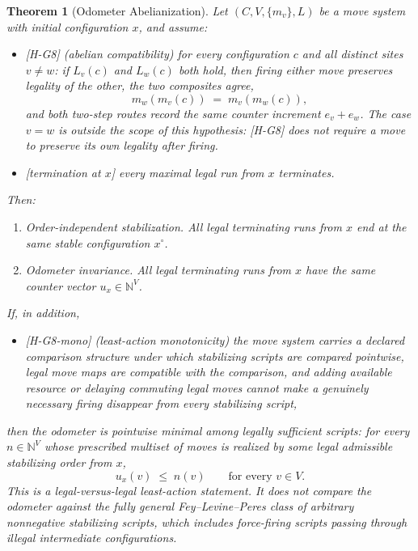 \documentclass[11pt]{article}
\newcommand{\lawGEight}{Odometer Abelianization}
\newtheorem{theorem}{Theorem}[section]
\theoremstyle{definition}
\begin{document}
\begin{theorem}[\lawGEight]\label{thm:G8}
Let $(C, V, \{m_v\}, L)$ be a move system with initial configuration $x$, and assume:
\begin{itemize}
  \item \textup{[H-G8]} (abelian compatibility) for every configuration $c$ and all \emph{distinct}
    sites $v \neq w$: if $L_v(c)$ and $L_w(c)$ both hold, then firing either move preserves legality
    of the other, the two composites agree,
    \[
      m_w(m_v(c)) \;=\; m_v(m_w(c)),
    \]
    and both two-step routes record the same counter increment $e_v + e_w$. The case $v = w$ is
    outside the scope of this hypothesis: \textup{[H-G8]} does not require a move to preserve its own
    legality after firing.
  \item \textup{[termination at $x$]} every maximal legal run from $x$ terminates.
\end{itemize}
Then:
\begin{enumerate}
  \item \emph{Order-independent stabilization.} All legal terminating runs from $x$ end at the same
    stable configuration $x^{\circ}$.
  \item \emph{Odometer invariance.} All legal terminating runs from $x$ have the same counter vector
    $u_x \in \mathbb{N}^{V}$.
\end{enumerate}
If, in addition,
\begin{itemize}
  \item \textup{[H-G8-mono]} (least-action monotonicity) the move system carries a declared comparison
    structure under which stabilizing scripts are compared pointwise, legal move maps are compatible
    with the comparison, and adding available resource or delaying commuting legal moves cannot make a
    genuinely necessary firing disappear from every stabilizing script,
\end{itemize}
then the odometer is pointwise minimal among legally sufficient scripts: for every $n \in
\mathbb{N}^{V}$ whose prescribed multiset of moves is realized by some legal admissible stabilizing
order from $x$,
\[
  u_x(v) \;\le\; n(v) \qquad \text{for every } v \in V.
\]
This is a legal-versus-legal least-action statement. It does not compare the odometer against the
fully general Fey--Levine--Peres class of arbitrary nonnegative stabilizing scripts, which includes
force-firing scripts passing through illegal intermediate configurations.
\end{theorem}
\end{document}
